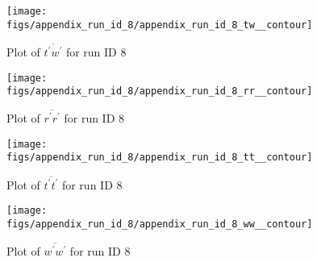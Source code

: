\begin{figure}[H]
\centering
\texttt{[image: figs/appendix\_run\_id\_8/appendix\_run\_id\_8\_tw\_\_contour]}
\caption{Plot of $\overline{t^\prime w^\prime}$ for run ID 8}
\label{fig:appendix_run_id_8_tw__contour}
\end{figure}


\begin{figure}[H]
\centering
\texttt{[image: figs/appendix\_run\_id\_8/appendix\_run\_id\_8\_rr\_\_contour]}
\caption{Plot of $\overline{r^\prime r^\prime}$ for run ID 8}
\label{fig:appendix_run_id_8_rr__contour}
\end{figure}


\begin{figure}[H]
\centering
\texttt{[image: figs/appendix\_run\_id\_8/appendix\_run\_id\_8\_tt\_\_contour]}
\caption{Plot of $\overline{t^\prime t^\prime}$ for run ID 8}
\label{fig:appendix_run_id_8_tt__contour}
\end{figure}


\begin{figure}[H]
\centering
\texttt{[image: figs/appendix\_run\_id\_8/appendix\_run\_id\_8\_ww\_\_contour]}
\caption{Plot of $\overline{w^\prime w^\prime}$ for run ID 8}
\label{fig:appendix_run_id_8_ww__contour}
\end{figure}


